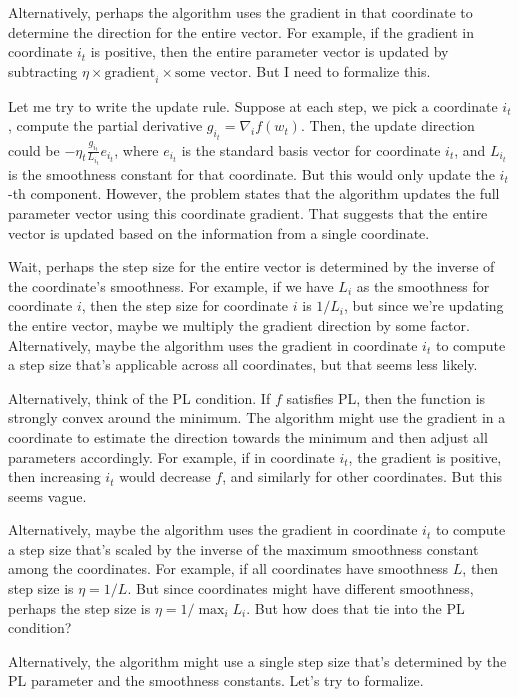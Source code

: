 \documentclass{article}
\begin{document}
Alternatively, perhaps the algorithm uses the gradient in that coordinate to determine the direction for the entire vector. For example, if the gradient in coordinate \( i_t \) is positive, then the entire parameter vector is updated by subtracting \( \eta \times \text{gradient}_i \times \text{some vector} \). But I need to formalize this.

Let me try to write the update rule. Suppose at each step, we pick a coordinate \( i_t \), compute the partial derivative \( g_{i_t} = \nabla_i f(w_t) \). Then, the update direction could be \( -\eta_t \frac{g_{i_t}}{L_{i_t}} e_{i_t} \), where \( e_{i_t} \) is the standard basis vector for coordinate \( i_t \), and \( L_{i_t} \) is the smoothness constant for that coordinate. But this would only update the \( i_t \)-th component. However, the problem states that the algorithm updates the full parameter vector using this coordinate gradient. That suggests that the entire vector is updated based on the information from a single coordinate.

Wait, perhaps the step size for the entire vector is determined by the inverse of the coordinate's smoothness. For example, if we have \( L_i \) as the smoothness for coordinate \( i \), then the step size for coordinate \( i \) is \( 1/L_i \), but since we're updating the entire vector, maybe we multiply the gradient direction by some factor. Alternatively, maybe the algorithm uses the gradient in coordinate \( i_t \) to compute a step size that's applicable across all coordinates, but that seems less likely.

Alternatively, think of the PL condition. If \( f \) satisfies PL, then the function is strongly convex around the minimum. The algorithm might use the gradient in a coordinate to estimate the direction towards the minimum and then adjust all parameters accordingly. For example, if in coordinate \( i_t \), the gradient is positive, then increasing \( i_t \) would decrease \( f \), and similarly for other coordinates. But this seems vague.

Alternatively, maybe the algorithm uses the gradient in coordinate \( i_t \) to compute a step size that's scaled by the inverse of the maximum smoothness constant among the coordinates. For example, if all coordinates have smoothness \( L \), then step size is \( \eta = 1/L \). But since coordinates might have different smoothness, perhaps the step size is \( \eta = 1/\max_i L_i \). But how does that tie into the PL condition?

Alternatively, the algorithm might use a single step size that's determined by the PL parameter and the smoothness constants. Let's try to formalize.
\end{document}
